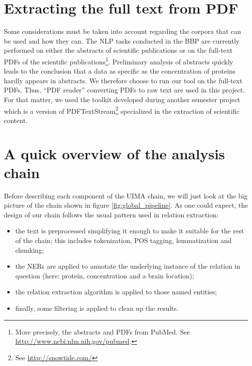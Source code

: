 \documentclass{report}
\begin{document}
				\section{Extracting the full text from PDF}
				Some considerations must be taken into account regarding the 
				corpora that can be used and how they can. The NLP tasks 
				conducted in the BBP are currently performed on either
				the abstracts of scientific publications or on the full-text PDFs 
				of the scientific publications\footnote{More
				precisely, the abstracts and PDFs from PubMed. See \url{http://www.ncbi.nlm.nih.gov/pubmed}.}. Preliminary
				analysis of abstracts quickly leads to the conclusion that a data 
				as specific as the concentration of proteins hardly
				appears in abstracts. We therefore choose to run our tool on the
				full-text PDFs. Thus, ``PDF reader''
				converting PDFs to raw text are used in this project. For that matter, we used the toolkit developed during
				another semester project \cite{rollier} which is a version of PDFTextStream\footnote{See \url{http://snowtide.com/}} specialized in the extraction of scientific content.	
				
				
				
				\section{A quick overview of the analysis chain}
				
				Before describing each component of the UIMA chain, we will just 
				look at the big picture of the chain shown in figure \ref{fig:global_pipeline}. As one could expect, the design of our chain follows 
				the usual pattern used in relation extraction:
				
				\begin{itemize}
					\item	the text is preprocessed simplifying it enough to make it suitable for the
							rest of the chain; this includes tokenization, POS tagging, lemmatization
							and chunking;
					\item	the NERs are applied to annotate the underlying instance of the relation
							in question (here: protein, concentration and a brain location);
					\item	the relation extraction algorithm is applied to those named entities;
					\item	finally, some filtering is applied to clean up the results.
				\end{itemize}
                
\end{document}
